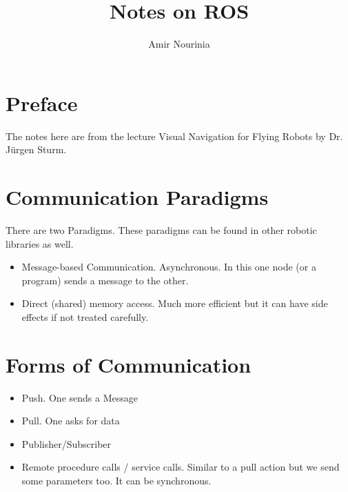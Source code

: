 \documentclass[]{report}
\title{Notes on ROS}
\author{Amir Nourinia}
\begin{document}
\maketitle
\section{Preface}
The notes here are from the lecture Visual Navigation for Flying Robots by Dr. Jürgen Sturm. 
\section{Communication Paradigms}
    There are two Paradigms. These paradigms can be found in other robotic libraries as well.
    \begin{itemize}
        \item Message-based Communication. Asynchronous. In this one node (or a program) sends a message to the other.
        \item Direct (shared) memory access. Much more efficient but it can have side effects if not treated carefully.
    \end{itemize}
\section*{Forms of Communication}
    \begin{itemize}
        \item Push. One sends a Message
        \item Pull. One asks for data
        \item Publisher/Subscriber
        \item Remote procedure calls / service calls. Similar to a pull action but we send some parameters too. It can be synchronous.
    \end{itemize}
\end{document}
